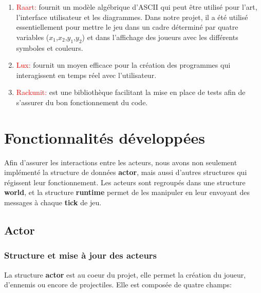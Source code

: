 \documentclass{article}
\begin{document}
\begin{enumerate}
\item \textcolor{red}{Raart:} fournit un modèle algébrique d'ASCII qui peut être utilisé pour l'art, l'interface utilisateur et les diagrammes. Dans notre projet, il a été utilisé essentiellement pour mettre le jeu dans un cadre déterminé par quatre variables ($x_1$,$x_2$,$y_1$,$y_2$) et dans l'affichage des joueurs avec les différents symboles et couleurs.
\item \textcolor{red}{Lux:} fournit un moyen efficace pour la création des programmes qui interagissent en temps réel avec l'utilisateur.
\item\textcolor{red}{Rackunit:} est une bibliothèque facilitant la mise en place de tests afin de s'assurer du bon fonctionnement du code.

\end{enumerate}

\section{Fonctionnalités développées}

Afin d'assurer les interactions entre les acteurs, nous avons non seulement implémenté la structure de données \textbf{actor}, mais aussi d'autres structures qui régissent leur fonctionnement. Les acteurs sont regroupés dans une structure \textbf{world}, et la structure \textbf{runtime} permet de les manipuler en leur envoyant des messages à chaque \textbf{tick} de jeu.

\subsection{Actor}

\subsubsection{Structure et mise à jour des acteurs}
La structure \textbf{actor} est au coeur du projet, elle permet la création du joueur, d'ennemis ou encore de projectiles. Elle est composée de quatre champs:
\end{document}
